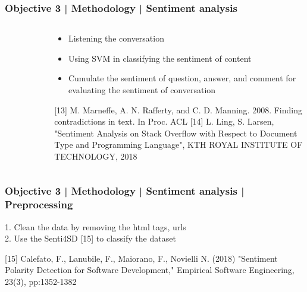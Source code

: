 \documentclass{beamer}
\begin{document}
\begin{frame}
\frametitle{Objective 3 | Methodology | Sentiment analysis}
\begin{columns}
	
	\begin{column}{.5\textwidth}
\begin{figure}
	\includegraphics[width=48mm]{sent3.png}	
	
\end{figure}
\end{column}


\begin{column}{.5\textwidth}
{\scriptsize \begin{itemize}
	\item Listening the conversation
	\item Using SVM in classifying the sentiment of content
	\item Cumulate the sentiment of question, answer, and comment for evaluating the sentiment of conversation
\end{itemize}}


\begin{thebibliography}{01}
	
	{\tiny {}  [13] M. Marneffe, A. N. Rafferty, and C. D. Manning. 2008. Finding contradictions in text. In Proc. ACL}
	{\tiny 	{} [14] L. Ling, S. Larsen, "Sentiment Analysis on Stack Overflow with Respect to Document Type and Programming Language", KTH ROYAL INSTITUTE OF TECHNOLOGY, 2018}


\end{thebibliography}



\end{column}

\end{columns}	
\end{frame}
\begin{frame}
\frametitle{Objective 3 | Methodology | Sentiment analysis | Preprocessing}
1. Clean the data by removing the html tags, urls  \\
2. Use the Senti4SD [15] to classify the dataset \\
\begin{thebibliography}{01}
{\tiny {} [15] Calefato, F., Lanubile, F., Maiorano, F., Novielli N. (2018) "Sentiment Polarity Detection for Software Development," Empirical Software Engineering, 23(3), pp:1352-1382}
\end{thebibliography}
\end{frame}
\end{document}
